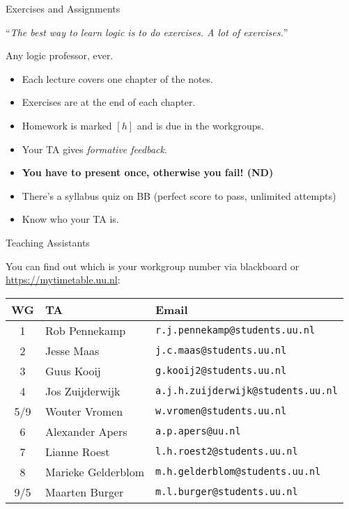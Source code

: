 \documentclass[../slides.tex]{subfiles}
\begin{document}
\begin{frame}{Exercises and Assignments}

``{\it The best way to learn logic is to do exercises. A lot of exercises.}''
\begin{flushright}
Any logic professor, ever.
\end{flushright}

	\begin{itemize}[<+->]
	
		\item Each lecture covers one chapter of the notes.
		
		\item Exercises are at the end of each chapter.
		
		\item Homework is marked $[h]$ and is due in the workgroups.
		
		\item Your TA gives \emph{formative feedback}.
		
		\item \textbf{You have to present once, otherwise you fail! (ND)}
		
		\item There's a syllabus quiz on BB (perfect score to pass, unlimited attempts)
		
		\item Know who your TA is.
	
	\end{itemize}

\end{frame}

\begin{frame}{Teaching Assistants}

You can find out which is your workgroup number via blackboard or \url{https://mytimetable.uu.nl}:
{\small \begin{center}
\begin{tabular}{| c | l | l |}
\hline
\textbf{WG} & \textbf{TA} & \textbf{Email}\\\hline
 1& Rob Pennekamp& \texttt{r.j.pennekamp@students.uu.nl}\\
 2& Jesse Maas& \texttt{j.c.maas@students.uu.nl}\\
 3& Guus Kooij& \texttt{g.kooij2@students.uu.nl}\\
 4& Jos Zuijderwijk& \texttt{a.j.h.zuijderwijk@students.uu.nl}\\
 5/9& Wouter Vromen& \texttt{w.vromen@students.uu.nl}\\
 6& Alexander Apers& \texttt{a.p.apers@uu.nl}\\
 7&Lianne Roest& \texttt{l.h.roest2@students.uu.nl}\\
 8& Marieke Gelderblom& \texttt{m.h.gelderblom@students.uu.nl}\\
 9/5& Maarten Burger& \texttt{m.l.burger@students.uu.nl}\\\hline
\end{tabular}
\end{center}}


\end{frame}
\end{document}
